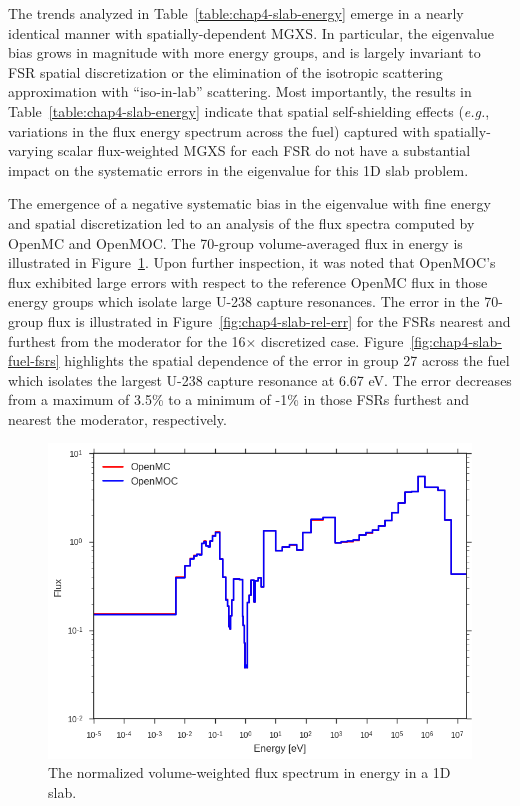 The trends analyzed in Table~\ref{table:chap4-slab-energy} emerge in a nearly identical manner with spatially-dependent \ac{MGXS}. In particular, the eigenvalue bias grows in magnitude with more energy groups, and is largely invariant to \ac{FSR} spatial discretization or the elimination of the isotropic scattering approximation with ``iso-in-lab'' scattering. Most importantly, the results in Table~\ref{table:chap4-slab-energy} indicate that spatial self-shielding effects (\textit{e.g.}, variations in the flux energy spectrum across the fuel) captured with spatially-varying scalar flux-weighted \ac{MGXS} for each \ac{FSR} do not have a substantial impact on the systematic errors in the eigenvalue for this 1D slab problem.

The emergence of a negative systematic bias in the eigenvalue with fine energy and spatial discretization led to an analysis of the flux spectra computed by OpenMC and OpenMOC. The 70-group volume-averaged flux in energy is illustrated in Figure~\ref{fig:chap4-slab-flux}. Upon further inspection, it was noted that OpenMOC's flux exhibited large errors with respect to the reference OpenMC flux in those energy groups which isolate large U-238 capture resonances. The error in the 70-group flux is illustrated in Figure~\ref{fig:chap4-slab-rel-err} for the \ac{FSR}s nearest and furthest from the moderator for the 16$\times$ discretized case. Figure~\ref{fig:chap4-slab-fuel-fsrs} highlights the spatial dependence of the error in group 27 across the fuel which isolates the largest U-238 capture resonance at 6.67 eV. The error decreases from a maximum of 3.5\% to a minimum of -1\% in those \ac{FSR}s furthest and nearest the moderator, respectively.

\begin{figure}[H]
  \centering
  \includegraphics[width=0.75\linewidth]{figures/biases/slab/vol-avg-flux}
\caption[Flux spectrum in a 1D slab.]{The normalized volume-weighted flux spectrum in energy in a 1D slab.}
\label{fig:chap4-slab-flux}
\end{figure}

